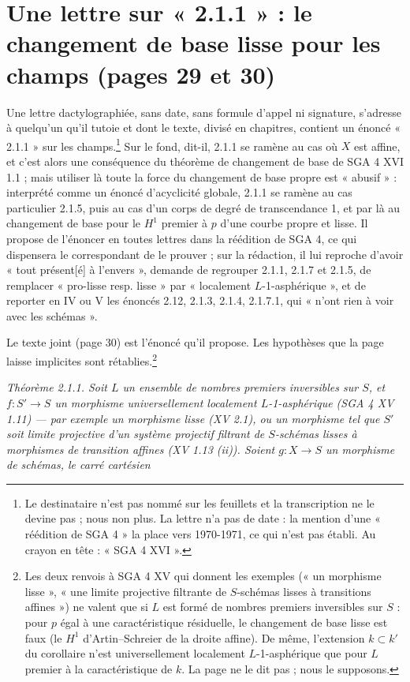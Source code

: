 \documentclass[11pt,a4paper]{article}
\begin{document}
\section*{Une lettre sur « 2.1.1 » : le changement de base lisse pour les champs (pages 29 et 30)}

Une lettre dactylographiée, sans date, sans formule d'appel ni signature,
s'adresse à quelqu'un qu'il tutoie et dont le texte, divisé en chapitres,
contient un énoncé « 2.1.1 » sur les champs.\footnote{Le destinataire n'est pas
nommé sur les feuillets et la transcription ne le devine pas ; nous non plus.
La lettre n'a pas de date : la mention d'une « réédition de SGA 4 » la place
vers 1970-1971, ce qui n'est pas établi. Au crayon en tête : « SGA 4 XVI ».}
Sur le fond, dit-il, 2.1.1 se ramène au cas où $X$ est affine, et c'est alors
une conséquence du théorème de changement de base de SGA 4 XVI 1.1 ; mais
utiliser là toute la force du changement de base propre est « abusif » :
interprété comme un énoncé d'acyclicité globale, 2.1.1 se ramène au cas
particulier 2.1.5, puis au cas d'un corps de degré de transcendance 1, et par
là au changement de base pour le $H^1$ premier à $p$ d'une courbe propre et
lisse. Il propose de l'énoncer en toutes lettres dans la réédition de SGA 4,
ce qui dispensera le correspondant de le prouver ; sur la rédaction, il lui
reproche d'avoir « tout présent[é] à l'envers », demande de regrouper 2.1.1,
2.1.7 et 2.1.5, de remplacer « pro-lisse resp. lisse » par « localement
$L$-1-asphérique », et de reporter en IV ou V les énoncés 2.12, 2.1.3, 2.1.4,
2.1.7.1, qui « n'ont rien à voir avec les schémas ».

Le texte joint (page 30) est l'énoncé qu'il propose. Les hypothèses que la
page laisse implicites sont rétablies.\footnote{Les deux renvois à SGA 4 XV
qui donnent les exemples (« un morphisme lisse », « une limite projective
filtrante de $S$-schémas lisses à transitions affines ») ne valent que si $L$
est formé de nombres premiers inversibles sur $S$ : pour $p$ égal à une
caractéristique résiduelle, le changement de base lisse est faux (le $H^1$
d'Artin--Schreier de la droite affine). De même, l'extension
$k \subset k'$ du corollaire n'est universellement localement
$L$-1-asphérique que pour $L$ premier à la caractéristique de $k$. La page ne
le dit pas ; nous le supposons.}

\emph{Théorème 2.1.1. Soit $L$ un ensemble de nombres premiers inversibles sur
$S$, et $f : S' \to S$ un morphisme universellement localement
$L$-1-asphérique (SGA 4 XV 1.11) --- par exemple un morphisme lisse (XV 2.1),
ou un morphisme tel que $S'$ soit limite projective d'un système projectif
filtrant de $S$-schémas lisses à morphismes de transition affines (XV 1.13
(ii)). Soient $g : X \to S$ un morphisme de schémas, le carré cartésien}
\end{document}
